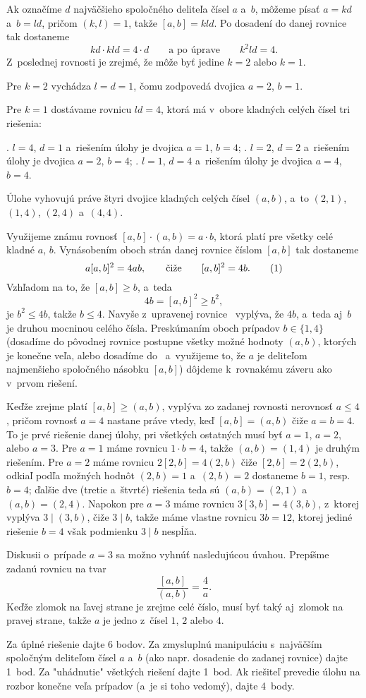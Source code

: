 {%
Ak označíme $d$ najväčšieho spoločného deliteľa čísel $a$ a~$b$,
môžeme písať $a=kd$ a~$b=ld$, pričom $(k,l)=1$, takže $[a,b]=kld$.
Po dosadení do danej rovnice tak dostaneme
$$
kd\cdot kl d=4\cdot d\qquad \text{a po úprave} \qquad k^2ld =4.
$$
Z~poslednej rovnosti je zrejmé, že môže byť jedine $k=2$ alebo $k=1$.

Pre $k=2$ vychádza $l=d=1$, čomu zodpovedá dvojica $a=2$, $b=1$.

Pre $k=1$ dostávame rovnicu $ld=4$, ktorá má v~obore kladných celých čísel
tri riešenia:

. $l=4$, $d=1$ a~riešením úlohy je dvojica $a=1$, $b=4$;
. $l=2$, $d=2$ a~riešením úlohy je dvojica $a=2$, $b=4$;
. $l=1$, $d=4$ a~riešením úlohy je dvojica $a=4$, $b=4$.

\zaver
Úlohe vyhovujú práve štyri dvojice kladných celých čísel
$(a,b)$, a~to $(2,1)$, $(1,4)$, $(2,4)$ a~$(4,4)$.

\ineriesenie
Využijeme známu rovnosť $[a,b]\cdot(a,b)=a\cdot b$,
ktorá platí pre všetky celé kladné $a$, $b$. Vynásobením oboch
strán danej rovnice číslom $[a,b]$ tak dostaneme
$$
a[a,b]^2=4ab, \qquad \text{čiže} \qquad [a,b]^2=4b. \tag1
$$
Vzhľadom na to, že $[a,b]\ge b$, a~teda
$$
4b=[a,b]^2\ge b^2,
$$
je $b^2 \le 4b$, takže $b \le 4$. Navyše z~upravenej
rovnice~ vyplýva, že $4b$, a~teda aj~$b$ je druhou mocninou celého čísla.
Preskúmaním oboch prípadov $b\in\{1,4\}$ (dosadíme do pôvodnej rovnice
postupne všetky možné hodnoty $(a,b)$, ktorých je konečne veľa, alebo
dosadíme do~ a~využijeme to, že $a$ je deliteľom najmenšieho spoločného
násobku $[a,b]$)
dôjdeme k~rovnakému záveru ako v~prvom riešení.

\ineriesenie
Keďže zrejme platí $[a,b]\ge(a,b)$, vyplýva zo zadanej rovnosti
nerovnosť $a\le4$, pričom rovnosť $a=4$ nastane práve vtedy, keď
$[a,b]=(a,b)$ čiže $a=b=4$. To je prvé riešenie danej úlohy, pri všetkých
ostatných musí byť $a=1$, $a=2$, alebo $a=3$. Pre $a=1$ máme rovnicu
$1\cdot b=4$, takže $(a,b)=(1,4)$ je druhým riešením. Pre $a=2$ máme
rovnicu $2[2,b]=4(2,b)$ čiže $[2,b]=2(2,b)$, odkiaľ podľa možných hodnôt
$(2,b)=1$ a~$(2,b)=2$ dostaneme $b=1$, resp. $b=4$; ďalšie dve (tretie
a~štvrté) riešenia teda sú $(a,b)=(2,1)$ a~$(a,b)=(2,4)$. Napokon pre $a=3$
máme rovnicu $3[3,b]=4(3,b)$, z~ktorej vyplýva $3\mid(3,b)$, čiže $3\mid b$,
takže máme vlastne rovnicu $3b=12$, ktorej jediné riešenie $b=4$ však
podmienku $3\mid b$ nespĺňa.

\poznamka
Diskusii o~prípade $a=3$ sa možno vyhnúť nasledujúcou úvahou.
Prepíšme zadanú rovnicu na tvar
$$
\frac{[a,b]}{(a,b)}=\frac{4}{a}.
$$
Keďže zlomok na ľavej strane je zrejme celé číslo, musí byť taký
aj~zlomok na pravej strane, takže $a$ je jedno z~čísel $1$, $2$ alebo $4$.

\nobreak\medskip\petit\noindent
Za úplné riešenie dajte 6 bodov.
Za zmysluplnú manipuláciu
s~najväčším spoločným deliteľom čísel $a$ a~$b$ (ako napr. dosadenie do
zadanej rovnice) dajte 1~bod. Za "uhádnutie" všetkých riešení dajte 1~bod. Ak
riešiteľ prevedie úlohu na rozbor konečne veľa prípadov (a~je si toho
vedomý), dajte 4~body.
\endpetit
\bigbreak}

